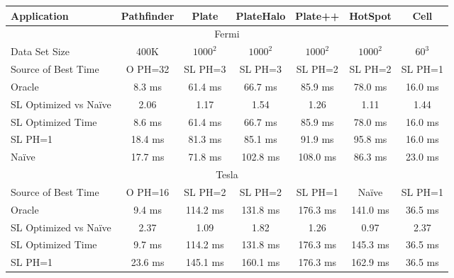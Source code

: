 \documentclass{sig-alternate}
\begin{document}
\begin{table}
\centering
\begin{tabular}{|l||c|c|c|c|c|c|}
\hline

{\bf Application} & {\bf Pathfinder} & {\bf Plate} & {\bf PlateHalo} & {\bf
  Plate++} & {\bf HotSpot} & {\bf Cell} \\
\hline

\multicolumn{7}{|c|}{Fermi}\\
\hline
\hline

Data Set Size	& 400K	& $1000^2$	& $1000^2$	& $1000^2$	& $1000^2$	& $60^3$	\\
\hline

Source of Best Time & O PH=32 	& SL PH=3	& SL PH=3	& SL PH=2	& SL PH=2	& SL PH=1	\\

Oracle		& 8.3 ms	& 61.4 ms	& 66.7 ms	& 85.9 ms	& 78.0	ms	& 16.0 ms	\\

SL Optimized vs Na\"{i}ve & 2.06 & 1.17		& 1.54		& 1.26		& 1.11		& 1.44		\\

SL Optimized Time & 8.6 ms	& 61.4	ms	& 66.7	ms	& 85.9	ms	& 78.0	ms	& 16.0	ms	\\

SL PH=1		& 18.4	ms	& 81.3	ms	& 85.1	ms	& 91.9	ms	& 95.8	ms	& 16.0	ms	\\

Na\"{i}ve	& 17.7	ms	& 71.8	ms	& 102.8 ms	& 108.0 ms	& 86.3	ms	& 23.0	ms	\\

\hline

\multicolumn{7}{|c|}{Tesla}\\
\hline
\hline

Source of Best Time & O PH=16 	& SL PH=2	& SL PH=2	& SL PH=1	& Na\"{i}ve	& SL PH=1	\\

Oracle		& 9.4 ms	& 114.2 ms	& 131.8 ms	& 176.3 ms	& 141.0 ms	& 36.5 ms	\\

SL Optimized vs Na\"{i}ve & 2.37 & 1.09		& 1.82		& 1.26		& 0.97		& 2.37		\\

SL Optimized Time & 9.7 ms	& 114.2 ms	& 131.8 ms	& 176.3 ms
& 145.3 ms	& 36.5  ms	\\

SL PH=1		& 23.6	ms	& 145.1 ms	& 160.1 ms	& 176.3 ms	& 162.9 ms	& 36.5	ms	\\


\end{tabular}
\end{table}
\end{document}
